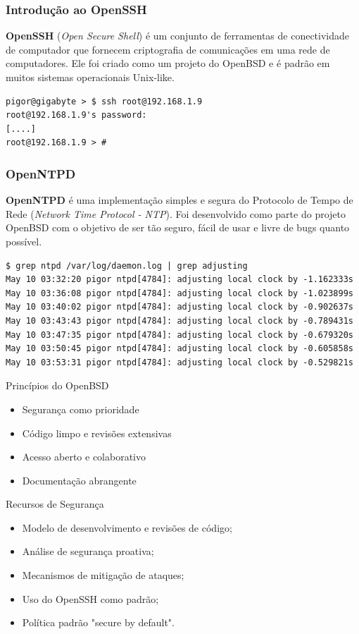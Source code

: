 \documentclass[9pt,xcolor=table]{beamer}
\begin{document}
\begin{frame}[fragile]
\frametitle{Introdução ao OpenSSH}
\textbf{OpenSSH} (\textit{Open Secure Shell}) é um conjunto de ferramentas de conectividade de computador que fornecem criptografia de comunicações em uma rede de computadores. Ele foi criado como um projeto do OpenBSD e é padrão em muitos sistemas operacionais Unix-like.
\vspace{0.5cm}
\begin{lstlisting}
pigor@gigabyte > $ ssh root@192.168.1.9
root@192.168.1.9's password:
[....]
root@192.168.1.9 > #
\end{lstlisting}
\end{frame}
\begin{frame}[fragile]
\frametitle{OpenNTPD}
\justifying
\textbf{OpenNTPD} é uma implementação simples e segura do Protocolo de Tempo de Rede (\textit{Network Time Protocol - NTP}). Foi desenvolvido como parte do projeto OpenBSD com o objetivo de ser tão seguro, fácil de usar e livre de bugs quanto possível.
\vspace{0.5cm}
\begin{lstlisting}
$ grep ntpd /var/log/daemon.log | grep adjusting
May 10 03:32:20 pigor ntpd[4784]: adjusting local clock by -1.162333s
May 10 03:36:08 pigor ntpd[4784]: adjusting local clock by -1.023899s
May 10 03:40:02 pigor ntpd[4784]: adjusting local clock by -0.902637s
May 10 03:43:43 pigor ntpd[4784]: adjusting local clock by -0.789431s
May 10 03:47:35 pigor ntpd[4784]: adjusting local clock by -0.679320s
May 10 03:50:45 pigor ntpd[4784]: adjusting local clock by -0.605858s
May 10 03:53:31 pigor ntpd[4784]: adjusting local clock by -0.529821s
\end{lstlisting}
\end{frame}
\begin{frame}{Princípios do OpenBSD}
  \begin{itemize}
    \item Segurança como prioridade
    \item Código limpo e revisões extensivas
    \item Acesso aberto e colaborativo
    \item Documentação abrangente
  \end{itemize}
\end{frame}
\begin{frame}{Recursos de Segurança}
  \begin{itemize}
    \item Modelo de desenvolvimento e revisões de código;
    \item Análise de segurança proativa;
    \item Mecanismos de mitigação de ataques;
    \item Uso do OpenSSH como padrão;
    \item Política padrão "secure by default".
  \end{itemize}
\end{frame}
\end{document}
